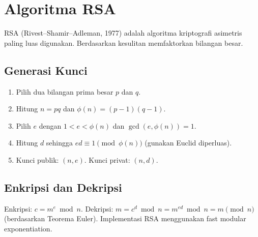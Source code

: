 \section{Algoritma RSA}

RSA (Rivest--Shamir--Adleman, 1977) adalah algoritma kriptografi asimetris paling luas digunakan. Berdasarkan kesulitan memfaktorkan bilangan besar.

\subsection{Generasi Kunci}
\begin{enumerate}
\item Pilih dua bilangan prima besar $p$ dan $q$.
\item Hitung $n = pq$ dan $\phi(n) = (p-1)(q-1)$.
\item Pilih $e$ dengan $1 < e < \phi(n)$ dan $\gcd(e, \phi(n)) = 1$.
\item Hitung $d$ sehingga $ed \equiv 1 \pmod{\phi(n)}$ (gunakan Euclid diperluas).
\item Kunci publik: $(n, e)$. Kunci privat: $(n, d)$.
\end{enumerate}

\subsection{Enkripsi dan Dekripsi}
Enkripsi: $c = m^e \bmod n$. Dekripsi: $m = c^d \bmod n = m^{ed} \bmod n = m \pmod{n}$ (berdasarkan Teorema Euler). Implementasi RSA menggunakan fast modular exponentiation.
